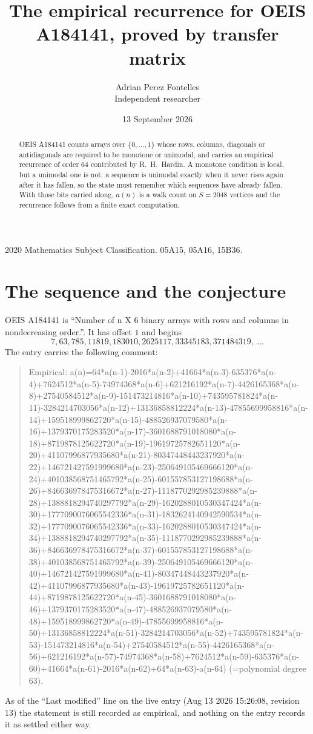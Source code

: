 \documentclass[11pt,a4paper]{article}
\title{The empirical recurrence for OEIS A184141, proved by transfer matrix}
\author{Adrian Perez Fontelles\\ \small Independent researcher}
\date{13 September 2026}
\theoremstyle{plain}
\theoremstyle{definition}
\begin{document}
\maketitle

\begin{abstract}
OEIS A184141 counts arrays over $\{0,\dots,1\}$ whose rows, columns, diagonals or
antidiagonals are required to be monotone or unimodal, and carries an empirical recurrence of
order $64$ contributed by R.~H.~Hardin. A monotone condition is local, but a unimodal one
is not: a sequence is unimodal exactly when it never rises again after it has fallen, so the
state must remember which sequences have already fallen. With those bits carried along, $a(n)$
is a walk count on $S=2048$ vertices and the recurrence follows from a finite exact
computation.
\end{abstract}

\noindent\small 2020 Mathematics Subject Classification. 05A15, 05A16, 15B36.\normalsize

\section{The sequence and the conjecture}

OEIS A184141 is ``Number of n X 6 binary arrays with rows and columns in nondecreasing order.''. It has offset $1$ and begins
\[
7, 63, 785, 11819, 183010, 2625117, 33345183, 371484319,\ \dots
\]
The entry carries the following comment:
\begin{quote}\small
Empirical: a(n)=64*a(n-1)-2016*a(n-2)+41664*a(n-3)-635376*a(n-4)+7624512*a(n-5)-74974368*a(n-6)+621216192*a(n-7)-4426165368*a(n-8)+27540584512*a(n-9)-151473214816*a(n-10)+743595781824*a(n-11)-3284214703056*a(n-12)+13136858812224*a(n-13)-47855699958816*a(n-14)+159518999862720*a(n-15)-488526937079580*a(n-16)+1379370175283520*a(n-17)-3601688791018080*a(n-18)+8719878125622720*a(n-19)-19619725782651120*a(n-20)+41107996877935680*a(n-21)-80347448443237920*a(n-22)+146721427591999680*a(n-23)-250649105469666120*a(n-24)+401038568751465792*a(n-25)-601557853127198688*a(n-26)+846636978475316672*a(n-27)-1118770292985239888*a(n-28)+1388818294740297792*a(n-29)-1620288010530347424*a(n-30)+1777090076065542336*a(n-31)-1832624140942590534*a(n-32)+1777090076065542336*a(n-33)-1620288010530347424*a(n-34)+1388818294740297792*a(n-35)-1118770292985239888*a(n-36)+846636978475316672*a(n-37)-601557853127198688*a(n-38)+401038568751465792*a(n-39)-250649105469666120*a(n-40)+146721427591999680*a(n-41)-80347448443237920*a(n-42)+41107996877935680*a(n-43)-19619725782651120*a(n-44)+8719878125622720*a(n-45)-3601688791018080*a(n-46)+1379370175283520*a(n-47)-488526937079580*a(n-48)+159518999862720*a(n-49)-47855699958816*a(n-50)+13136858812224*a(n-51)-3284214703056*a(n-52)+743595781824*a(n-53)-151473214816*a(n-54)+27540584512*a(n-55)-4426165368*a(n-56)+621216192*a(n-57)-74974368*a(n-58)+7624512*a(n-59)-635376*a(n-60)+41664*a(n-61)-2016*a(n-62)+64*a(n-63)-a(n-64) (=polynomial degree 63).
\end{quote}
As of the ``Last modified'' line on the live entry (Aug 13 2026 15:26:08, revision 13) the statement is
still recorded as empirical, and nothing on the entry records it as settled either way.
\end{document}
